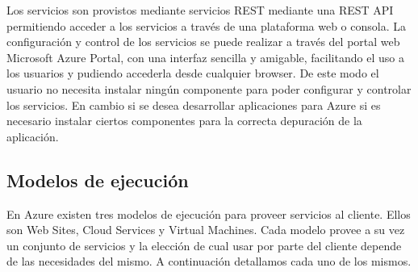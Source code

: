 Los servicios son provistos mediante servicios REST mediante una REST API permitiendo acceder a los servicios a través de una plataforma web o consola. La configuración y control de los servicios se puede realizar a través del portal web Microsoft Azure Portal, con una interfaz sencilla y amigable, facilitando el uso a los usuarios y pudiendo accederla desde cualquier browser. De este modo el usuario no necesita instalar ningún componente para poder configurar y controlar los servicios. En cambio si se desea desarrollar aplicaciones para Azure si es necesario instalar ciertos componentes para la correcta depuración de la aplicación.


\subsection {Modelos de ejecución}
En Azure existen tres modelos de ejecución para proveer servicios al cliente. Ellos son Web Sites, Cloud Services y Virtual Machines. Cada modelo provee a su vez un conjunto de servicios y la elección de cual usar  por parte del cliente depende de las necesidades del mismo. A continuación detallamos cada uno de los mismos.

